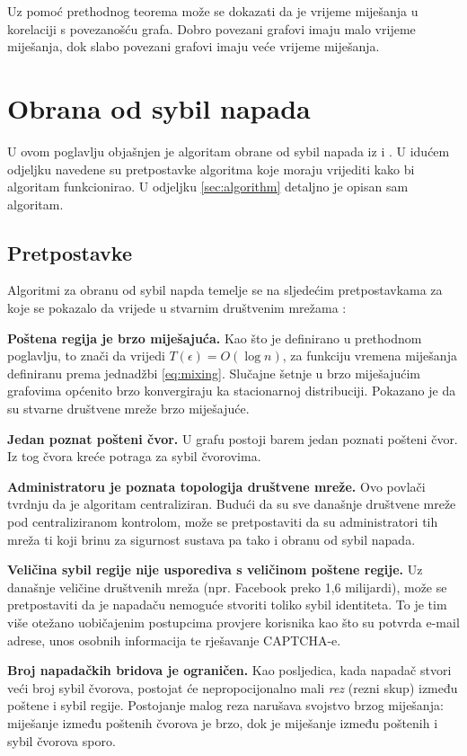\documentclass[times, utf8, seminar, numeric]{fer}
\begin{document}
Uz pomoć prethodnog teorema može se dokazati da je vrijeme miješanja u korelaciji s povezanošću grafa. Dobro povezani grafovi imaju malo vrijeme miješanja, dok slabo povezani grafovi imaju veće vrijeme miješanja. \cite{friends}

\chapter{Obrana od sybil napada} \label{ch:defense}
U ovom poglavlju objašnjen je algoritam obrane od sybil napada iz \cite{sybil-defender-old} i \cite{sybil-defender}. U idućem odjeljku navedene su pretpostavke algoritma koje moraju vrijediti kako bi algoritam funkcionirao. U odjeljku \ref{sec:algorithm} detaljno je opisan sam algoritam.

\section{Pretpostavke}
Algoritmi za obranu od sybil napda temelje se na sljedećim pretpostavkama za koje se pokazalo da vrijede u stvarnim društvenim mrežama \cite{sybil-defender}:

\textbf{Poštena regija je brzo miješajuća.} Kao što je definirano u prethodnom poglavlju, to znači da vrijedi $T(\epsilon) = O(\log n)$, za funkciju vremena miješanja definiranu prema jednadžbi \ref{eq:mixing}. Slučajne šetnje u brzo miješajućim grafovima općenito brzo konvergiraju ka stacionarnoj distribuciji. \cite{sybil-defender} Pokazano je da su stvarne društvene mreže brzo miješajuće. \cite{sybil-limit}

\textbf{Jedan poznat pošteni čvor.} U grafu postoji barem jedan poznati pošteni čvor. Iz tog čvora kreće potraga za sybil čvorovima.

\textbf{Administratoru je poznata topologija društvene mreže.} Ovo povlači tvrdnju da je algoritam centraliziran. Budući da su sve današnje društvene mreže pod centraliziranom kontrolom, može se pretpostaviti da su administratori tih mreža ti koji brinu za sigurnost sustava pa tako i obranu od sybil napada.

\textbf{Veličina sybil regije nije usporediva s veličinom poštene regije.} Uz današnje veličine društvenih mreža (npr. Facebook preko 1,6 milijardi), može se pretpostaviti da je napadaču nemoguće stvoriti toliko sybil identiteta. To je tim više otežano uobičajenim postupcima provjere korisnika kao što su potvrda e-mail adrese, unos osobnih informacija te rješavanje CAPTCHA-e.

\textbf{Broj napadačkih bridova je ograničen.} Kao posljedica, kada napadač stvori veći broj sybil čvorova, postojat će nepropocijonalno mali \textit{rez} (rezni skup) između poštene i sybil regije. Postojanje malog reza narušava svojstvo brzog miješanja: miješanje između poštenih čvorova je brzo, dok je miješanje između poštenih i sybil čvorova sporo.
\end{document}
